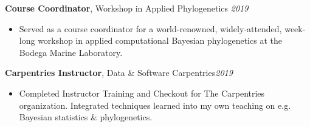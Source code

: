 \documentclass[11pt,margin,line]{resume}
\begin{document}
\begin{resume}
\textbf{Course Coordinator}, Workshop in Applied Phylogenetics \hfill \emph{2019}
\begin{itemize}[noitemsep]
\item Served as a course coordinator for a world-renowned, widely-attended, week-long workshop in applied computational Bayesian phylogenetics at the Bodega Marine Laboratory.
\end{itemize}
\vspace{-1.5mm}

\textbf{Carpentries Instructor}, Data \& Software Carpentries\hfill \emph{2019}
\begin{itemize}[noitemsep]
\item Completed Instructor Training and Checkout for The Carpentries organization. Integrated techniques learned into my own teaching on e.g. Bayesian statistics \& phylogenetics.\\
\end{itemize}
\vspace{-4.5mm}

\begin{comment}
\section{\large\textcolor{DarkRed}{Field \& Labwork}}

\textbf{Archaeological / Paleontological Excavator} \hfill \emph{2013}\\
During the 2013 summer field season I helped in excavation efforts ongoing at La Ferrassie, a Neandertal archaeological and paleontological site in Savignac-de-Miremont, France.
\vspace{-1.5mm}

\textbf{Water Quality Analyst} \hfill \emph{2011}\\
I performed water quality analyses (of salinity, reactive nitrogen concentrations, etc.) of a large set of streams distributed across the North Island of New Zealand.
\vspace{-1.5mm}

\textbf{Stable Isotope Ecologist} \hfill \emph{2012 - 2013}\\
As an undergraduate researcher, I examined how environmental and ecological conditions were recorded in enamel stable isotope ratios (carbon and oxygen) and dental microwear textures for several marsupial taxa throughout Australasia.
\vspace{-1.5mm}
\end{comment}


\end{resume}
\end{document}
